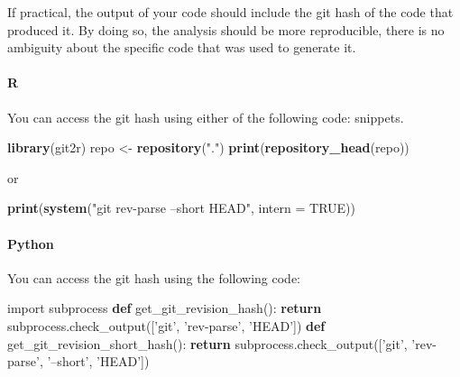 \documentclass[]{book}
\newenvironment{Shaded}{\begin{snugshade}}{\end{snugshade}}
\newcommand{\ControlFlowTok}[1]{\textcolor[rgb]{0.13,0.29,0.53}{\textbf{#1}}}
\newcommand{\DataTypeTok}[1]{\textcolor[rgb]{0.13,0.29,0.53}{#1}}
\newcommand{\ImportTok}[1]{#1}
\newcommand{\KeywordTok}[1]{\textcolor[rgb]{0.13,0.29,0.53}{\textbf{#1}}}
\newcommand{\NormalTok}[1]{#1}
\newcommand{\OtherTok}[1]{\textcolor[rgb]{0.56,0.35,0.01}{#1}}
\newcommand{\StringTok}[1]{\textcolor[rgb]{0.31,0.60,0.02}{#1}}
\let\oldparagraph\paragraph
\renewcommand{\paragraph}[1]{\oldparagraph{#1}\mbox{}}
\begin{document}
If practical, the output of your code should include the git hash of the code that produced it. By doing so, the analysis should be
more reproducible, there is no ambiguity about the specific code that was used to generate it.

\hypertarget{r}{%
\paragraph{R}\label{r}}

You can access the git hash using either of the following code:
snippets.

\begin{Shaded}
\begin{Highlighting}[]
\KeywordTok{library}\NormalTok{(git2r)}
\NormalTok{repo <-}\StringTok{ }\KeywordTok{repository}\NormalTok{(}\StringTok{"."}\NormalTok{)}
\KeywordTok{print}\NormalTok{(}\KeywordTok{repository_head}\NormalTok{(repo))}
\end{Highlighting}
\end{Shaded}

or

\begin{Shaded}
\begin{Highlighting}[]
\KeywordTok{print}\NormalTok{(}\KeywordTok{system}\NormalTok{(}\StringTok{"git rev-parse --short HEAD"}\NormalTok{, }\DataTypeTok{intern =} \OtherTok{TRUE}\NormalTok{))}
\end{Highlighting}
\end{Shaded}

\hypertarget{python}{%
\paragraph{Python}\label{python}}

You can access the git hash using the following code:

\begin{Shaded}
\begin{Highlighting}[]
\ImportTok{import}\NormalTok{ subprocess}
\KeywordTok{def}\NormalTok{ get_git_revision_hash():}
    \ControlFlowTok{return}\NormalTok{ subprocess.check_output([}\StringTok{'git'}\NormalTok{, }\StringTok{'rev-parse'}\NormalTok{, }\StringTok{'HEAD'}\NormalTok{])}
\KeywordTok{def}\NormalTok{ get_git_revision_short_hash():}
    \ControlFlowTok{return}\NormalTok{ subprocess.check_output([}\StringTok{'git'}\NormalTok{, }\StringTok{'rev-parse'}\NormalTok{, }\StringTok{'--short'}\NormalTok{, }\StringTok{'HEAD'}\NormalTok{])}
\end{Highlighting}
\end{Shaded}
\end{document}
